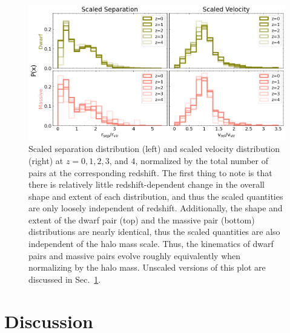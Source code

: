 \documentclass[twocolumn]{aastex631}
\begin{document}
    \begin{figure}[htp]
      \centering
      \includegraphics[width=\textwidth]{scaledcombodist_1000.png}
      \caption{Scaled separation distribution (left) and scaled velocity distribution (right) at $z=0,1,2,3$, and $4$, normalized by the total number of pairs at the corresponding redshift. 
      The first thing to note is that there is relatively little redshift-dependent change in the overall shape and extent of each distribution, and thus the scaled quantities are only loosely independent of redshift. 
      Additionally, the shape and extent of the dwarf pair (top) and the massive pair (bottom) distributions are nearly identical, thus the scaled quantities are also independent of the halo mass scale. Thus, the kinematics of dwarf pairs and massive pairs evolve roughly equivalently when normalizing by the halo mass.
      Unscaled versions of this plot are discussed in Sec.~\ref{sec:discussion}.
      }
      \label{fig:scaled-dist}
    \end{figure} 


\section{Discussion}\label{sec:discussion}




\end{document}
